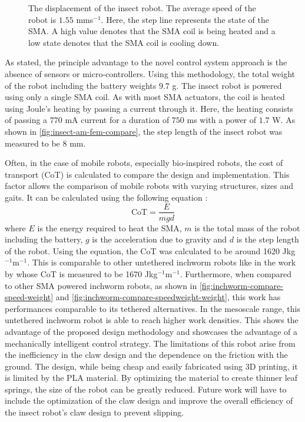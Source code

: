 \begin{figure}[hbt!] %
  \centering
  \resizebox{0.9\columnwidth}{!}{}
  \caption{The displacement of the insect robot. The average speed of the robot is $1.55$ mms$^{-1}$. Here, the step line represents the state of the SMA. A high value denotes that the SMA coil is being heated and a low state denotes that the SMA coil is cooling down.}
  \label{fig:insect-disp}
\end{figure}

As stated, the principle advantage to the novel control system approach is the absence of sensors or micro-controllers. Using this methodology, the total weight of the robot including the battery weights $9.7$ g. The insect robot is powered using only a single SMA coil. As with most SMA actuators, the coil is heated using Joule's heating by passing a current through it. Here, the heating consists of passing a $770$ mA current for a duration of $750$ ms with a power of $1.7$ W. As shown in \cref{fig:insect-am-fem-compare}, the step length of the insect robot was measured to be $8$ mm.

Often, in the case of mobile robots, especially bio-inspired robots, the cost of transport (CoT) is calculated to compare the design and implementation. This factor allows the comparison of mobile robots with varying structures, sizes and gaits. It can be calculated using the following equation :
\begin{equation}\label{eq:CoT}
    \textrm{CoT} = \frac{E}{mgd}
\end{equation}
where $E$ is the energy required to heat the SMA, $m$ is the total mass of the robot including the battery, $g$ is the acceleration due to gravity and $d$ is the step length of the robot. Using the equation, the CoT was calculated to be around 1620 Jkg$^{-1}$m$^{-1}$. This is comparable to other untethered inchworm robots like in the work by \cite{jiAutonomousUntetheredFast2019} whose CoT is measured to be 1670 Jkg$^{-1}$m$^{-1}$. Furthermore, when compared to other SMA powered inchworm robots, as shown in \cref{fig:inchworm-compare-speed-weight} and \cref{fig:inchworm-compare-speedweight-weight}, this work has performances comparable to its tethered alternatives. In the mesoscale range, this untethered inchworm robot is able to reach higher work densities. This shows the advantage of the proposed design methodology and showcases the advantage of a mechanically intelligent control strategy. The limitations of this robot arise from the inefficiency in the claw design and the dependence on the friction with the ground. The design, while being cheap and easily fabricated using 3D printing, it is limited by the PLA material. By optimizing the material to create thinner leaf springs, the size of the robot can be greatly reduced. Future work will have to include the optimization of the claw design and improve the overall efficiency of the insect robot's claw design to prevent slipping.

